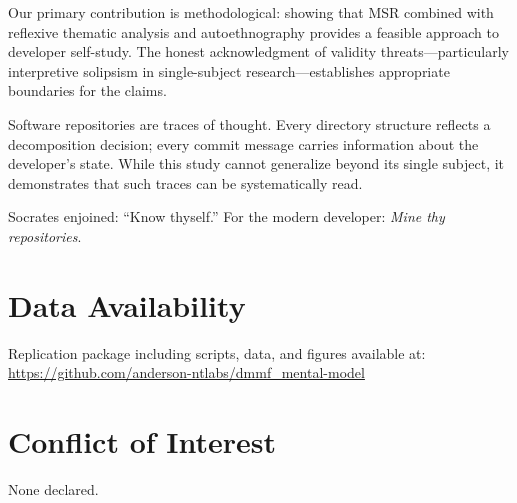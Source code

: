 \documentclass{ntlabs-preprint}
\begin{document}
Our primary contribution is methodological: showing that MSR combined with reflexive thematic analysis and autoethnography provides a feasible approach to developer self-study. The honest acknowledgment of validity threats---particularly interpretive solipsism in single-subject research---establishes appropriate boundaries for the claims.

Software repositories are traces of thought. Every directory structure reflects a decomposition decision; every commit message carries information about the developer's state. While this study cannot generalize beyond its single subject, it demonstrates that such traces can be systematically read.

Socrates enjoined: ``Know thyself.'' For the modern developer: \textit{Mine thy repositories}.

\section*{Data Availability}

Replication package including scripts, data, and figures available at:\\
\url{https://github.com/anderson-ntlabs/dmmf_mental-model}

\section*{Conflict of Interest}

None declared.



\end{document}
